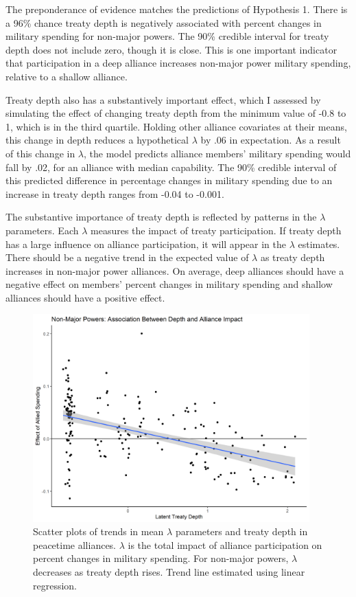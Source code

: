 \documentclass[12pt]{article}
\begin{document}
The preponderance of evidence matches the predictions of Hypothesis 1. 
There is a 96\% chance treaty depth is negatively associated with percent changes in military spending for non-major powers.
The 90\% credible interval for treaty depth does not include zero, though it is close. 
This is one important indicator that participation in a deep alliance increases non-major power military spending, relative to a shallow alliance. 


Treaty depth also has a substantively important effect, which I assessed by simulating the effect of changing treaty depth from the minimum value of -0.8 to 1, which is in the third quartile. 
Holding other alliance covariates at their means, this change in depth reduces a hypothetical $\lambda$ by .06 in expectation.
As a result of this change in $\lambda$, the model predicts alliance members' military spending would fall by .02, for an alliance with median capability. 
The 90\% credible interval of this predicted difference in percentage changes in military spending due to an increase in treaty depth ranges from -0.04 to -0.001. 


The substantive importance of treaty depth is reflected by patterns in the $\lambda$ parameters. 
Each $\lambda$ measures the impact of treaty participation. 
If treaty depth has a large influence on alliance participation, it will appear in the $\lambda$ estimates. 
There should be a negative trend in the expected value of $\lambda$ as treaty depth increases in non-major power alliances.
On average, deep alliances should have a negative effect on members' percent changes in military spending and shallow alliances should have a positive effect.  


\begin{figure}[htbp]
	\centering
		\includegraphics[width=0.95\textwidth]{../figures/lambda-ld-nonmaj.png}
	\caption{Scatter plots of trends in mean $\lambda$ parameters and treaty depth in peacetime alliances. $\lambda$ is the total impact of alliance participation on percent changes in military spending. For non-major powers, $\lambda$ decreases as treaty depth rises. Trend line estimated using linear regression.}
	\label{fig:lambda-ld-nonmaj-peace}
\end{figure}
\end{document}
